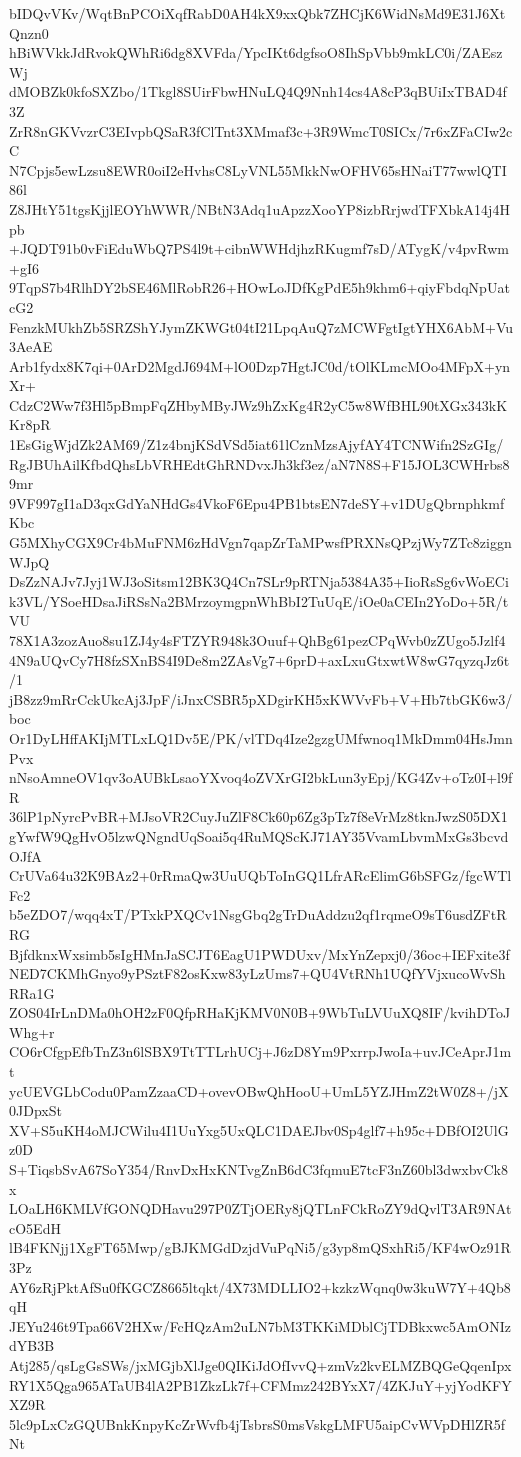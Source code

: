 bIDQvVKv/WqtBnPCOiXqfRabD0AH4kX9xxQbk7ZHCjK6WidNsMd9E31J6XtQnzn0
hBiWVkkJdRvokQWhRi6dg8XVFda/YpcIKt6dgfsoO8IhSpVbb9mkLC0i/ZAEszWj
dMOBZk0kfoSXZbo/1Tkgl8SUirFbwHNuLQ4Q9Nnh14cs4A8cP3qBUiIxTBAD4f3Z
ZrR8nGKVvzrC3EIvpbQSaR3fClTnt3XMmaf3c+3R9WmcT0SICx/7r6xZFaCIw2cC
N7Cpjs5ewLzsu8EWR0oiI2eHvhsC8LyVNL55MkkNwOFHV65sHNaiT77wwlQTI86l
Z8JHtY51tgsKjjlEOYhWWR/NBtN3Adq1uApzzXooYP8izbRrjwdTFXbkA14j4Hpb
+JQDT91b0vFiEduWbQ7PS4l9t+cibnWWHdjhzRKugmf7sD/ATygK/v4pvRwm+gI6
9TqpS7b4RlhDY2bSE46MlRobR26+HOwLoJDfKgPdE5h9khm6+qiyFbdqNpUatcG2
FenzkMUkhZb5SRZShYJymZKWGt04tI21LpqAuQ7zMCWFgtIgtYHX6AbM+Vu3AeAE
Arb1fydx8K7qi+0ArD2MgdJ694M+lO0Dzp7HgtJC0d/tOlKLmcMOo4MFpX+ynXr+
CdzC2Ww7f3Hl5pBmpFqZHbyMByJWz9hZxKg4R2yC5w8WfBHL90tXGx343kKKr8pR
1EsGigWjdZk2AM69/Z1z4bnjKSdVSd5iat61lCznMzsAjyfAY4TCNWifn2SzGIg/
RgJBUhAilKfbdQhsLbVRHEdtGhRNDvxJh3kf3ez/aN7N8S+F15JOL3CWHrbs89mr
9VF997gI1aD3qxGdYaNHdGs4VkoF6Epu4PB1btsEN7deSY+v1DUgQbrnphkmfKbc
G5MXhyCGX9Cr4bMuFNM6zHdVgn7qapZrTaMPwsfPRXNsQPzjWy7ZTc8ziggnWJpQ
DsZzNAJv7Jyj1WJ3oSitsm12BK3Q4Cn7SLr9pRTNja5384A35+IioRsSg6vWoECi
k3VL/YSoeHDsaJiRSsNa2BMrzoymgpnWhBbI2TuUqE/iOe0aCEIn2YoDo+5R/tVU
78X1A3zozAuo8su1ZJ4y4sFTZYR948k3Ouuf+QhBg61pezCPqWvb0zZUgo5Jzlf4
4N9aUQvCy7H8fzSXnBS4I9De8m2ZAsVg7+6prD+axLxuGtxwtW8wG7qyzqJz6t/1
jB8zz9mRrCckUkcAj3JpF/iJnxCSBR5pXDgirKH5xKWVvFb+V+Hb7tbGK6w3/boc
Or1DyLHffAKIjMTLxLQ1Dv5E/PK/vlTDq4Ize2gzgUMfwnoq1MkDmm04HsJmnPvx
nNsoAmneOV1qv3oAUBkLsaoYXvoq4oZVXrGI2bkLun3yEpj/KG4Zv+oTz0I+l9fR
36lP1pNyrcPvBR+MJsoVR2CuyJuZlF8Ck60p6Zg3pTz7f8eVrMz8tknJwzS05DX1
gYwfW9QgHvO5lzwQNgndUqSoai5q4RuMQScKJ71AY35VvamLbvmMxGs3bcvdOJfA
CrUVa64u32K9BAz2+0rRmaQw3UuUQbToInGQ1LfrARcElimG6bSFGz/fgcWTlFc2
b5eZDO7/wqq4xT/PTxkPXQCv1NsgGbq2gTrDuAddzu2qf1rqmeO9sT6usdZFtRRG
BjfdknxWxsimb5sIgHMnJaSCJT6EagU1PWDUxv/MxYnZepxj0/36oc+IEFxite3f
NED7CKMhGnyo9yPSztF82osKxw83yLzUms7+QU4VtRNh1UQfYVjxucoWvShRRa1G
ZOS04IrLnDMa0hOH2zF0QfpRHaKjKMV0N0B+9WbTuLVUuXQ8IF/kvihDToJWhg+r
CO6rCfgpEfbTnZ3n6lSBX9TtTTLrhUCj+J6zD8Ym9PxrrpJwoIa+uvJCeAprJ1mt
ycUEVGLbCodu0PamZzaaCD+ovevOBwQhHooU+UmL5YZJHmZ2tW0Z8+/jX0JDpxSt
XV+S5uKH4oMJCWilu4I1UuYxg5UxQLC1DAEJbv0Sp4glf7+h95c+DBfOI2UlGz0D
S+TiqsbSvA67SoY354/RnvDxHxKNTvgZnB6dC3fqmuE7tcF3nZ60bl3dwxbvCk8x
LOaLH6KMLVfGONQDHavu297P0ZTjOERy8jQTLnFCkRoZY9dQvlT3AR9NAtcO5EdH
lB4FKNjj1XgFT65Mwp/gBJKMGdDzjdVuPqNi5/g3yp8mQSxhRi5/KF4wOz91R3Pz
AY6zRjPktAfSu0fKGCZ8665ltqkt/4X73MDLLIO2+kzkzWqnq0w3kuW7Y+4Qb8qH
JEYu246t9Tpa66V2HXw/FcHQzAm2uLN7bM3TKKiMDblCjTDBkxwc5AmONIzdYB3B
Atj285/qsLgGsSWs/jxMGjbXlJge0QIKiJdOfIvvQ+zmVz2kvELMZBQGeQqenIpx
RY1X5Qga965ATaUB4lA2PB1ZkzLk7f+CFMmz242BYxX7/4ZKJuY+yjYodKFYXZ9R
5lc9pLxCzGQUBnkKnpyKcZrWvfb4jTsbrsS0msVskgLMFU5aipCvWVpDHlZR5fNt
